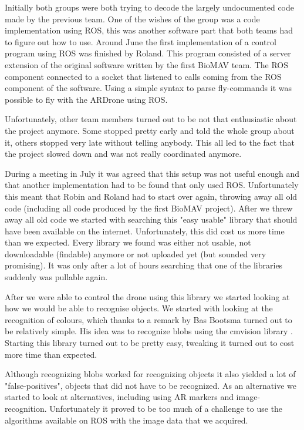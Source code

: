 \documentclass[a4paper,10pt]{article}
\begin{document}
Initially both groups were both trying to decode the largely undocumented code made by the previous team.
One of the wishes of the group was a code implementation using ROS, this was another software part that both teams had to figure out how to use. 
Around June the first implementation of a control program using ROS was finished by Roland. 
This program consisted of a server extension of the original software written by the first BioMAV team.  
The ROS component connected to a socket that listened to calls coming from the ROS component of the software. 
Using a simple syntax to parse fly-commands it was possible to fly with the ARDrone using ROS.  

Unfortunately, other team members turned out to be not that enthusiastic about the project anymore. 
Some stopped pretty early and told the whole group about it, others stopped very late without telling anybody.
This all led to the fact that the project slowed down and was not really coordinated anymore. 

During a meeting in July it was agreed that this setup was not useful enough and that another implementation had to be found that only used ROS. 
Unfortunately this meant that Robin and Roland had to start over again, throwing away all old code (including all code produced by the first BioMAV project).  
After we threw away all old code we started with searching this "easy usable" library that should have been available on the internet. 
Unfortunately, this did cost us more time than we expected.
Every library we found was either not usable, not downloadable (findable) anymore or not uploaded yet (but sounded very promising). 
It was only after a lot of hours searching that one of the libraries suddenly was pullable again. 

After we were able to control the drone using this library we started looking at how we would be able to recognise objects. 
We started with looking at the recognition of colours, which thanks to a remark by Bas Bootsma turned out to be relatively simple. 
His idea was to recognize blobs using the cmvision library \cite{cmvision}. 
Starting this library turned out to be pretty easy, tweaking it turned out to cost more time than expected. 

Although recognizing blobs worked for recognizing objects it also yielded a lot of "false-positives", objects that did not have to be recognized.
As an alternative we started to look at alternatives, including using AR markers and image-recognition. 
Unfortunately it proved to be too much of a challenge to use the algorithms available on ROS with the image data that we acquired. 
\end{document}
